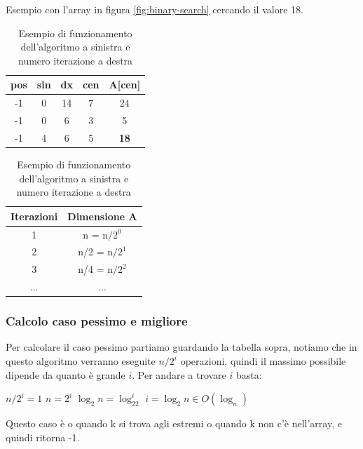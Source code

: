 \begin{example}
Esempio con l'array in figura \ref{fig:binary-search} cercando il valore 18.
\begin{table}[h!]
    \centering
    \setlength{\tabcolsep}{10pt}
    \renewcommand{\arraystretch}{1.8}
    \begin{tabular}{|c|c|c|c|c|}
    \hline
        pos & sin & dx & cen & A[cen]  \\\hline
        -1 & 0 & 14 & 7 & 24  \\\hline 
        -1 & 0 & 6 & 3 & 5  \\\hline
        -1 & 4 & 6 & 5 & \textbf{18}  \\
    \hline
    \end{tabular}
    \hspace{1cm}
    \begin{tabular}{|c|c|}
    \hline
        Iterazioni & Dimensione A \\\hline
        1 & n \: = \: n$/2^0$  \\\hline 
        2 & n/2 \: = \: n$/2^1$ \\\hline
        3 & n/4 \: = \: n$/2^2$ \\\hline
        ... & ... \\
    \hline
    \end{tabular}
    \caption{Esempio di funzionamento dell'algoritmo a sinistra e numero iterazione a destra}
\end{table}
\end{example}

\subsubsection{Calcolo caso pessimo e migliore}
Per calcolare il caso pessimo partiamo guardando la tabella sopra, notiamo che in questo algoritmo verranno eseguite $n/2^i$ operazioni, quindi il massimo possibile dipende da quanto è grande $i$. Per andare a trovare $i$ basta:
\begin{center}
    $n/2^i = 1$ \hspace{.3cm} $n = 2^i$ \hspace{.3cm} $\log_2n = \log_22^i$ \hspace{.3cm} $i = \log_2n \in O(\log_n)$
\end{center}
Questo caso è o quando k si trova agli estremi o quando k non c'è nell'array, e quindi ritorna -1.